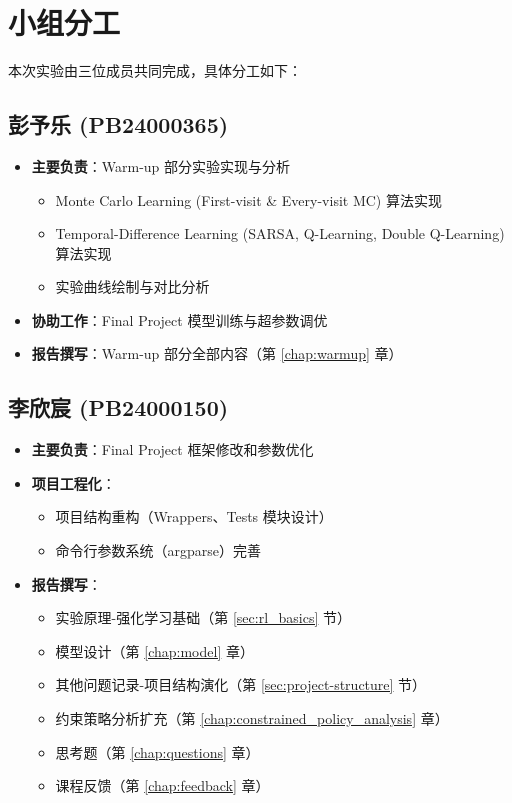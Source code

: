 \documentclass[oneside]{ctexbook}
\begin{document}
\section{小组分工}

本次实验由三位成员共同完成，具体分工如下：

\subsection{彭予乐 (PB24000365)}
\begin{itemize}
    \item \textbf{主要负责}：Warm-up 部分实验实现与分析
    \begin{itemize}
        \item Monte Carlo Learning (First-visit \& Every-visit MC) 算法实现
        \item Temporal-Difference Learning (SARSA, Q-Learning, Double Q-Learning) 算法实现
        \item 实验曲线绘制与对比分析
    \end{itemize}
    \item \textbf{协助工作}：Final Project 模型训练与超参数调优
    \item \textbf{报告撰写}：Warm-up 部分全部内容（第 \ref{chap:warmup} 章）
\end{itemize}

\subsection{李欣宸 (PB24000150)}
\begin{itemize}
    \item \textbf{主要负责}：Final Project 框架修改和参数优化
    \item \textbf{项目工程化}：
    \begin{itemize}
        \item 项目结构重构（Wrappers、Tests 模块设计）
        \item 命令行参数系统（argparse）完善
    \end{itemize}
    \item \textbf{报告撰写}：
    \begin{itemize}
        \item 实验原理-强化学习基础（第 \ref{sec:rl_basics} 节）
        \item 模型设计（第 \ref{chap:model} 章）
        \item 其他问题记录-项目结构演化（第 \ref{sec:project-structure} 节）
        \item 约束策略分析扩充（第 \ref{chap:constrained_policy_analysis} 章）
        \item 思考题（第 \ref{chap:questions} 章）
        \item 课程反馈（第 \ref{chap:feedback} 章）
    \end{itemize}
\end{itemize}
\end{document}
